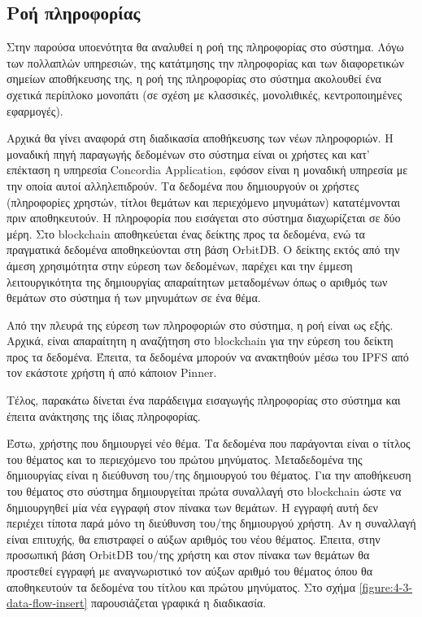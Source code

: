 \subsection{Ροή πληροφορίας} \label{subsection:4-3-9-data-flow}

Στην παρούσα υποενότητα θα αναλυθεί η ροή της πληροφορίας στο σύστημα. Λόγω των πολλαπλών υπηρεσιών, της κατάτμησης την πληροφορίας και των διαφορετικών σημείων αποθήκευσης της, η ροή της πληροφορίας στο σύστημα ακολουθεί ένα σχετικά περίπλοκο μονοπάτι (σε σχέση με κλασσικές, μονολιθικές, κεντροποιημένες εφαρμογές).

Αρχικά θα γίνει αναφορά στη διαδικασία αποθήκευσης των νέων πληροφοριών. Η μοναδική πηγή παραγωγής δεδομένων στο σύστημα είναι οι χρήστες και κατ' επέκταση η υπηρεσία Concordia Application, εφόσον είναι η μοναδική υπηρεσία με την οποία αυτοί αλληλεπιδρούν. Τα δεδομένα που δημιουργούν οι χρήστες (πληροφορίες χρηστών, τίτλοι θεμάτων και περιεχόμενο μηνυμάτων) κατατέμνονται πριν αποθηκευτούν. Η πληροφορία που εισάγεται στο σύστημα διαχωρίζεται σε δύο μέρη. Στο blockchain αποθηκεύεται ένας δείκτης προς τα δεδομένα, ενώ τα πραγματικά δεδομένα αποθηκεύονται στη βάση OrbitDB. Ο δείκτης εκτός από την άμεση χρησιμότητα στην εύρεση των δεδομένων, παρέχει και την έμμεση λειτουργικότητα της δημιουργίας απαραίτητων μεταδομένων όπως ο αριθμός των θεμάτων στο σύστημα ή των μηνυμάτων σε ένα θέμα.

Από την πλευρά της εύρεση των πληροφοριών στο σύστημα, η ροή είναι ως εξής. Αρχικά, είναι απαραίτητη η αναζήτηση στο blockchain για την εύρεση του δείκτη προς τα δεδομένα. Έπειτα, τα δεδομένα μπορούν να ανακτηθούν μέσω του IPFS από τον εκάστοτε χρήστη ή από κάποιον Pinner.

Τέλος, παρακάτω δίνεται ένα παράδειγμα εισαγωγής πληροφορίας στο σύστημα και έπειτα ανάκτησης της ίδιας πληροφορίας.

Έστω, χρήστης που δημιουργεί νέο θέμα. Τα δεδομένα που παράγονται είναι ο τίτλος του θέματος και το περιεχόμενο του πρώτου μηνύματος. Μεταδεδομένα της δημιουργίας είναι η διεύθυνση του/της δημιουργού του θέματος. Για την αποθήκευση του θέματος στο σύστημα δημιουργείται πρώτα συναλλαγή στο blockchain ώστε να δημιουργηθεί μία νέα εγγραφή στον πίνακα των θεμάτων. Η εγγραφή αυτή δεν περιέχει τίποτα παρά μόνο τη διεύθυνση του/της δημιουργού χρήστη. Αν η συναλλαγή είναι επιτυχής, θα επιστραφεί ο αύξων αριθμός του νέου θέματος. Έπειτα, στην προσωπική βάση OrbitDB του/της χρήστη και στον πίνακα των θεμάτων θα προστεθεί εγγραφή με αναγνωριστικό τον αύξων αριθμό του θέματος όπου θα αποθηκευτούν τα δεδομένα του τίτλου και πρώτου μηνύματος. Στο σχήμα \ref{figure:4-3-data-flow-insert} παρουσιάζεται γραφικά η διαδικασία.

